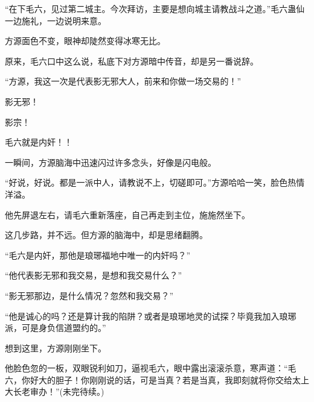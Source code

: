\begin{this_body}
“在下毛六，见过第二城主。今次拜访，主要是想向城主请教战斗之道。”毛六蛊仙一边施礼，一边说明来意。

方源面色不变，眼神却陡然变得冰寒无比。

原来，毛六口中这么说，私底下对方源暗中传音，却是另一番说辞。

“方源，我这一次是代表影无邪大人，前来和你做一场交易的！”

影无邪！

影宗！

毛六就是内奸！！

一瞬间，方源脑海中迅速闪过许多念头，好像是闪电般。

“好说，好说。都是一派中人，请教说不上，切磋即可。”方源哈哈一笑，脸色热情洋溢。

他先屏退左右，请毛六重新落座，自己再走到主位，施施然坐下。

这几步路，并不远。但方源的脑海中，却是思绪翻腾。

“毛六是内奸，那他是琅琊福地中唯一的内奸吗？”

“他代表影无邪和我交易，是想和我交易什么？”

“影无邪那边，是什么情况？忽然和我交易？”

“他是诚心的吗？还是算计我的陷阱？或者是琅琊地灵的试探？毕竟我加入琅琊派，可是身负信道盟约的。”

想到这里，方源刚刚坐下。

他脸色忽的一板，双眼锐利如刀，逼视毛六，眼中露出滚滚杀意，寒声道：“毛六，你好大的胆子！你刚刚说的话，可是当真？若是当真，我即刻就将你交给太上大长老审办！”(未完待续。)

\end{this_body}

